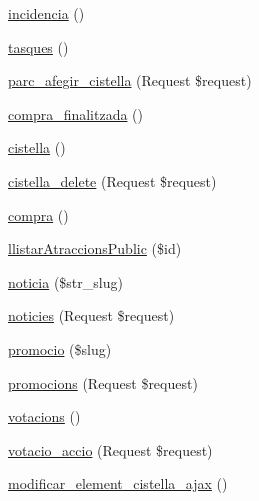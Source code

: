 \begin{DoxyCompactItemize}
\item 
\mbox{\hyperlink{class_app_1_1_http_1_1_controllers_1_1_home_controller_a409895028fee4d862b0c246d328fc72a}{incidencia}} ()
\item 
\mbox{\hyperlink{class_app_1_1_http_1_1_controllers_1_1_home_controller_a8b53b208f8d18f80640f256ccc345fe1}{tasques}} ()
\item 
\mbox{\hyperlink{class_app_1_1_http_1_1_controllers_1_1_home_controller_a72c76c798e03e897d0f1b75e604a5e79}{parc\+\_\+afegir\+\_\+cistella}} (Request \$request)
\item 
\mbox{\hyperlink{class_app_1_1_http_1_1_controllers_1_1_home_controller_a6003d512d5ba780cfd039d1c0abae046}{compra\+\_\+finalitzada}} ()
\item 
\mbox{\hyperlink{class_app_1_1_http_1_1_controllers_1_1_home_controller_af02bbdb3fa93a6391b1fce6f5b23cd6e}{cistella}} ()
\item 
\mbox{\hyperlink{class_app_1_1_http_1_1_controllers_1_1_home_controller_a11ee599bb613616f83b0371a7a0a8503}{cistella\+\_\+delete}} (Request \$request)
\item 
\mbox{\hyperlink{class_app_1_1_http_1_1_controllers_1_1_home_controller_a0a64a9609854f3e21d21406463231c15}{compra}} ()
\item 
\mbox{\hyperlink{class_app_1_1_http_1_1_controllers_1_1_home_controller_a262199a25151d1e2a7e55d5804316aed}{llistar\+Atraccions\+Public}} (\$id)
\item 
\mbox{\hyperlink{class_app_1_1_http_1_1_controllers_1_1_home_controller_a19fd5bebfe8684866269510bb89b92dc}{noticia}} (\$str\+\_\+slug)
\item 
\mbox{\hyperlink{class_app_1_1_http_1_1_controllers_1_1_home_controller_aabb9523680ff3421356ae6ff2b61eed9}{noticies}} (Request \$request)
\item 
\mbox{\hyperlink{class_app_1_1_http_1_1_controllers_1_1_home_controller_a80ff321acb2def7f4917effa7b4de5c8}{promocio}} (\$slug)
\item 
\mbox{\hyperlink{class_app_1_1_http_1_1_controllers_1_1_home_controller_af075ef8c6ea5491e8e8005d79c985317}{promocions}} (Request \$request)
\item 
\mbox{\hyperlink{class_app_1_1_http_1_1_controllers_1_1_home_controller_a4fb75d6f81cb35e6c55993e6e650636c}{votacions}} ()
\item 
\mbox{\hyperlink{class_app_1_1_http_1_1_controllers_1_1_home_controller_a1e27f7c6bccc8ab6836307ecc7bd0a64}{votacio\+\_\+accio}} (Request \$request)
\item 
\mbox{\hyperlink{class_app_1_1_http_1_1_controllers_1_1_home_controller_a7e222596b630908b4058e4b90e5c3c5c}{modificar\+\_\+element\+\_\+cistella\+\_\+ajax}} ()

\end{DoxyCompactItemize}
